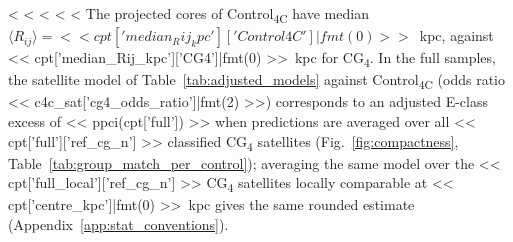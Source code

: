 \documentclass{aa}
\newcommand{\CC}{Control\textsubscript{4C}}
\newcommand{\CG}{CG\textsubscript{4}}
\newcommand{\Rmed}{\langle R_{ij}\rangle}
\begin{document}
<%
<%
<%
<%
<%
The projected cores of \CC{} have median \(\Rmed=<< cpt['median_Rij_kpc']['Control4C']|fmt(0) >>\)~kpc, against << cpt['median_Rij_kpc']['CG4']|fmt(0) >>~kpc for \CG{}. In the full samples, the satellite model of Table~\ref{tab:adjusted_models} against \CC{} (odds ratio << c4c_sat['cg4_odds_ratio']|fmt(2) >>) corresponds to an adjusted E-class excess of << ppci(cpt['full']) >> when predictions are averaged over all << cpt['full']['ref_cg_n'] >> classified \CG{} satellites (Fig.~\ref{fig:compactness}, Table~\ref{tab:group_match_per_control}); averaging the same model over the << cpt['full_local']['ref_cg_n'] >> \CG{} satellites locally comparable at << cpt['centre_kpc']|fmt(0) >>~kpc gives the same rounded estimate (Appendix~\ref{app:stat_conventions}).
\end{document}
